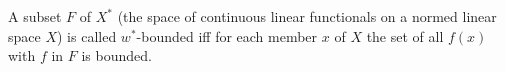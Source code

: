 A subset $F$ of $X^*$ (the space of continuous linear functionals on a normed linear space $X$) is called $w^*$-bounded iff for each member $x$ of $X$ the set of all $f(x)$ with $f$ in $F$ is bounded.
